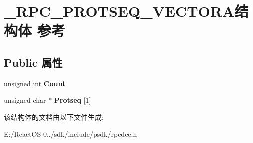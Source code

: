 \hypertarget{struct___r_p_c___p_r_o_t_s_e_q___v_e_c_t_o_r_a}{}\section{\+\_\+\+R\+P\+C\+\_\+\+P\+R\+O\+T\+S\+E\+Q\+\_\+\+V\+E\+C\+T\+O\+R\+A结构体 参考}
\label{struct___r_p_c___p_r_o_t_s_e_q___v_e_c_t_o_r_a}
\subsection*{Public 属性}
\begin{DoxyCompactItemize}
\item 
\mbox{\label{struct___r_p_c___p_r_o_t_s_e_q___v_e_c_t_o_r_a_abef93fe4157bcc239140b4fe9443fc3f}} 
unsigned int {\bfseries Count}
\item 
\mbox{\label{struct___r_p_c___p_r_o_t_s_e_q___v_e_c_t_o_r_a_a551f1fa7dca614752731019f4e5dae6f}} 
unsigned char $\ast$ {\bfseries Protseq} \mbox{[}1\mbox{]}
\end{DoxyCompactItemize}


该结构体的文档由以下文件生成\+:\begin{DoxyCompactItemize}
\item 
E\+:/\+React\+O\+S-\/0../sdk/include/psdk/rpcdce.\+h\end{DoxyCompactItemize}
